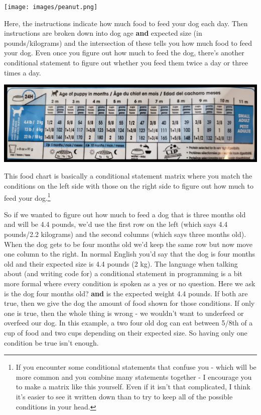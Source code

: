 \documentclass[
]{krantz}
\begin{document}
\texttt{[image: images/peanut.png]}

Here, the instructions indicate how much food to feed your dog each day. Then instructions are broken down into dog age \textbf{and} expected size (in pounds/kilograms) and the intersection of these tells you how much food to feed your dog. Even once you figure out how much to feed the dog, there's another conditional statement to figure out whether you feed them twice a day or three times a day.

\includegraphics{images/dog_food.PNG}

This food chart is basically a conditional statement matrix where you match the conditions on the left side with those on the right side to figure out how much to feed your dog.\footnote{If you encounter some conditional statements that confuse you - which will be more common and you combine many statements together - I encourage you to make a matrix like this yourself. Even if it isn't that complicated, I think it's easier to see it written down than to try to keep all of the possible conditions in your head.}

So if we wanted to figure out how much to feed a dog that is three months old and will be 4.4 pounds, we'd use the first row on the left (which says 4.4 pounds/2.2 kilograms) and the second columns (which says three months old). When the dog gets to be four months old we'd keep the same row but now move one column to the right. In normal English you'd say that the dog is four months old and their expected size is 4.4 pounds (2 kg). The language when talking about (and writing code for) a conditional statement in programming is a bit more formal where every condition is spoken as a yes or no question. Here we ask is the dog four months old? \textbf{and} is the expected weight 4.4 pounds. If both are true, then we give the dog the amount of food shown for those conditions. If only one is true, then the whole thing is wrong - we wouldn't want to underfeed or overfeed our dog. In this example, a two four old dog can eat between 5/8th of a cup of food and two cups depending on their expected size. So having only one condition be true isn't enough.
\end{document}
